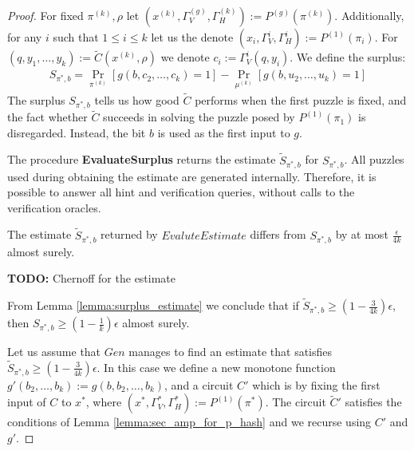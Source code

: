 \begin{proof}
For fixed $\pi^{(k)}, \rho$ let $(x^{(k)}, \Gamma_V^{(g)}, \Gamma_H^{(k)}) := P^{(g)}(\pi^{(k)})$.
Additionally, for any $i$ such that $1 \leq i \leq k$ let us the denote $(x_i, \Gamma_V^{i}, \Gamma_H^{i}) := P^{(1)}(\pi_i)$.
For $(q,y_1, \dots, y_k) := \widetilde{C}(x^{(k)}, \rho)$ we denote $c_i := \Gamma_V^i(q,y_i)$.
We define the surplus:
\begin{align}
  \label{eq:s_pi_b}
S_{\pi^*, b} = \underset{\pi^{(k)}}{\Pr}\left[g(b, c_2, \dots, c_k) = 1\right] - \underset{\mu^{(k)}}{\Pr}\left[g(b, u_2, \dots, u_k) = 1\right]
\end{align}
%
The surplus $S_{\pi^*, b}$ tells us how good $\widetilde{C}$ performs when the first puzzle is fixed,
and the fact whether $\widetilde{C}$ succeeds in solving the puzzle posed by $P^{(1)}(\pi_1)$ is disregarded.
Instead, the bit $b$ is used as the first input to $g$.

The procedure \textbf{EvaluateSurplus} returns the estimate $\widetilde{S}_{\pi^*, b}$ for $S_{\pi^*, b}$.
All puzzles used during obtaining the estimate are generated internally.
Therefore, it is possible to answer all hint and verification queries, without calls to the verification oracles.
%
\begin{lemma}
  \label{lemma:surplus_estimate}
The estimate $\widetilde{S}_{\pi^*,b}$ returned by $EvaluteEstimate$ differs from $S_{\pi^*, b}$ by at most $\frac{\epsilon}{4k}$ almost surely.
\end{lemma}
\begin{todo}
  \textbf{TODO:} Chernoff for the estimate
\end{todo}
%
From Lemma \ref{lemma:surplus_estimate} we conclude that if $\widetilde{S}_{\pi^*,b} \geq (1-\frac{3}{4k})\epsilon$, then $S_{\pi^*,b} \geq (1-\frac{1}{k})\epsilon$ almost surely.

Let us assume that $Gen$ manages to find an estimate that satisfies $\widetilde{S}_{\pi^*,b} \geq (1-\frac{3}{4k})\epsilon$.
In this case we define a new monotone function $g'(b_2, \dots, b_k) := g(b, b_2, \dots, b_k)$,
and a circuit $C'$ which is by fixing the first input of $C$ to $x^*$, where $(x^*, \Gamma_V^*, \Gamma_H^*) := P^{(1)}(\pi^*)$.
The circuit $\widetilde{C}'$ satisfies the conditions of Lemma \ref{lemma:sec_amp_for_p_hash} and we recurse using $C'$ and $g'$.


\end{proof}
